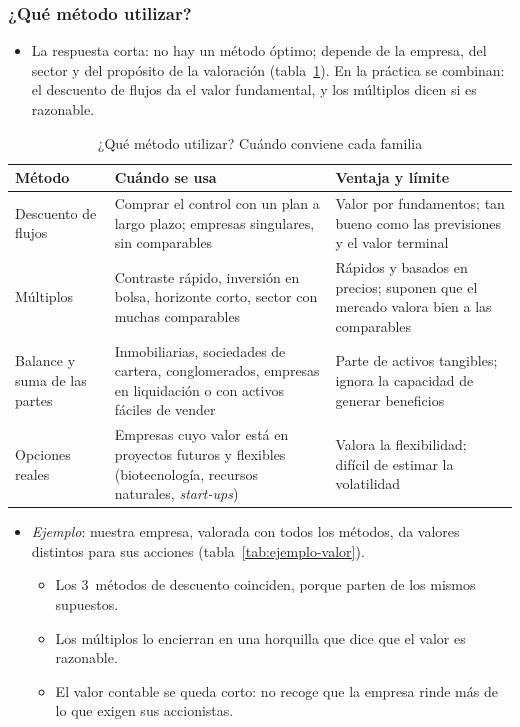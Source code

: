 \documentclass[11pt]{article}
\begin{document}
\subsubsection{¿Qué método utilizar?}\label{sec:que-metodo}

\begin{itemize}
\item La respuesta corta: no hay un método óptimo; depende de la empresa, del sector y del propósito de la valoración (tabla~\ref{tab:metodo}). En la práctica se combinan: el descuento de flujos da el valor fundamental, y los múltiplos dicen si es razonable.
\end{itemize}

\begin{table}[H]
\centering
\caption{¿Qué método utilizar? Cuándo conviene cada familia}\label{tab:metodo}
\begin{tabular}{>{\raggedright\arraybackslash}m{2.6cm}>{\raggedright\arraybackslash}m{5.2cm}>{\raggedright\arraybackslash}m{5.8cm}}
\toprule
\rowcolor{tceeazulpalido}\textbf{Método} & \textbf{Cuándo se usa} & \textbf{Ventaja y límite} \\
\midrule
Descuento de flujos & Comprar el control con un plan a largo plazo; empresas singulares, sin comparables & Valor por fundamentos; tan bueno como las previsiones y el valor terminal \\
Múltiplos & Contraste rápido, inversión en bolsa, horizonte corto, sector con muchas comparables & Rápidos y basados en precios; suponen que el mercado valora bien a las comparables \\
Balance y suma de las partes & Inmobiliarias, sociedades de cartera, conglomerados, empresas en liquidación o con activos fáciles de vender & Parte de activos tangibles; ignora la capacidad de generar beneficios \\
Opciones reales & Empresas cuyo valor está en proyectos futuros y flexibles (biotecnología, recursos naturales, \emph{start-ups}) & Valora la flexibilidad; difícil de estimar la volatilidad \\
\bottomrule
\end{tabular}
\end{table}

\begin{itemize}
\item \emph{Ejemplo}: nuestra empresa, valorada con todos los métodos, da valores distintos para sus acciones (tabla~\ref{tab:ejemplo-valor}).
  \begin{itemize}
  \item Los 3~métodos de descuento coinciden, porque parten de los mismos supuestos.
  \item Los múltiplos lo encierran en una horquilla que dice que el valor es razonable.
  \item El valor contable se queda corto: no recoge que la empresa rinde más de lo que exigen sus accionistas.
  \end{itemize}
\end{itemize}
\end{document}
